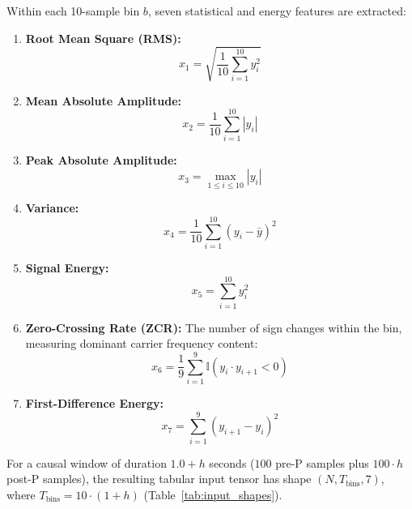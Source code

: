\documentclass[journal]{IEEEtran}
\begin{document}
Within each 10-sample bin $b$, seven statistical and energy features are extracted:
\begin{enumerate}
    \item \textbf{Root Mean Square (RMS):}
    \begin{equation}
    x_1 = \sqrt{\frac{1}{10} \sum_{i=1}^{10} y_i^2}
    \end{equation}
    \item \textbf{Mean Absolute Amplitude:}
    \begin{equation}
    x_2 = \frac{1}{10} \sum_{i=1}^{10} |y_i|
    \end{equation}
    \item \textbf{Peak Absolute Amplitude:}
    \begin{equation}
    x_3 = \max_{1 \le i \le 10} |y_i|
    \end{equation}
    \item \textbf{Variance:}
    \begin{equation}
    x_4 = \frac{1}{10} \sum_{i=1}^{10} (y_i - \bar{y})^2
    \end{equation}
    \item \textbf{Signal Energy:}
    \begin{equation}
    x_5 = \sum_{i=1}^{10} y_i^2
    \end{equation}
    \item \textbf{Zero-Crossing Rate (ZCR):} The number of sign changes within the bin, measuring dominant carrier frequency content:
    \begin{equation}
    x_6 = \frac{1}{9} \sum_{i=1}^9 \mathbb{I}(y_i \cdot y_{i+1} < 0)
    \end{equation}
    \item \textbf{First-Difference Energy:}
    \begin{equation}
    x_7 = \sum_{i=1}^9 (y_{i+1} - y_i)^2
    \end{equation}
\end{enumerate}

For a causal window of duration $1.0 + h$ seconds ($100$ pre-P samples plus $100 \cdot h$ post-P samples), the resulting tabular input tensor has shape $(N, T_{\text{bins}}, 7)$, where $T_{\text{bins}} = 10 \cdot (1 + h)$ (Table~\ref{tab:input_shapes}).

\begin{table}[t]
\caption{Input Tensor Dimensions Across Observation Horizons}
\label{tab:input_shapes}
\centering
\footnotesize
{}
\end{table}
\end{document}
